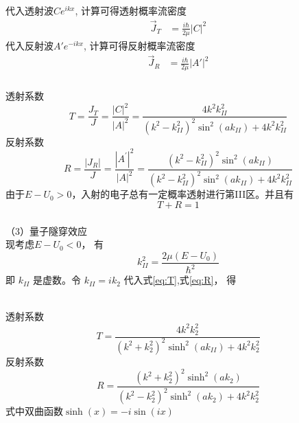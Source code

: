 \begin{frame}
  \frametitle{}
  代入透射波$Ce^{ikx}$, 计算可得透射概率流密度
  $$
\begin{aligned}
    \vec{J}_T 
    &= \frac{i \hbar}{2 \mu} \left\vert C \right\vert ^2 
\end{aligned}
$$
代入反射波$A'e^{-ikx}$, 计算可得反射概率流密度
  $$
\begin{aligned}
    \vec{J}_R 
    &= \frac{i \hbar}{2 \mu} \left\vert A' \right\vert ^2 
\end{aligned}
$$
\end{frame} 

\begin{frame}
  \frametitle{}
透射系数
\begin{equation}\label{eq:T}
 T=\frac{J_T}{J}=\frac{|C|^2}{|A|^2}=\frac{4 k^2 k_{II}^2}{\left(k^2-k_{II}^2\right)^2 \sin ^2 (a k_{II})+4 k^2 k_{II}^2}   
\end{equation}
反射系数
\begin{equation}\label{eq:R}
    R=\frac{\left|J_R\right|}{J}=\frac{\left|A^{\prime}\right|^2}{|A|^2}=\frac{\left(k^2-k_{II}^2\right)^2 \sin ^2 (a k_{II})}{\left(k^2-k_{II}^2\right)^2 \sin ^2 (a k_{II})+4 k^2 k_{II}^2}   
   \end{equation}
\emf[注意：] 由于$E-U_0 > 0$，入射的电子总有一定概率透射进行第III区。并且有\[ T+R =1\] 
\end{frame} 

\begin{frame}
  \frametitle{}
  （3）量子隧穿效应 \\
  现考虑$E-U_0 < 0$， 有
\[k^2_{II}=\frac{2\mu (E-U_0)}{\hbar^2} \]
即 $k_{II}$ 是虚数。令 $k_{II}= i k_2 $
代入式\ref{eq:T},式\ref{eq:R}， 得 

~~\\ 
透射系数
\begin{equation}\label{eq:T2}
 T=\frac{4 k^2 k_{2}^2}{\left(k^2+k_{2}^2\right)^2 \sinh ^2 (a k_{II})+4 k^2 k_{2}^2}   
\end{equation}
反射系数
\begin{equation}\label{eq:R2}
    R=\frac{\left(k^2+k_{2}^2\right)^2 \sinh ^2 (a k_{2})}{\left(k^2-k_{2}^2\right)^2 \sinh ^2 (a k_{2})+4 k^2 k_{2}^2}   
   \end{equation}
式中双曲函数$\sinh(x) = -i \sin(ix)$
\end{frame} 

